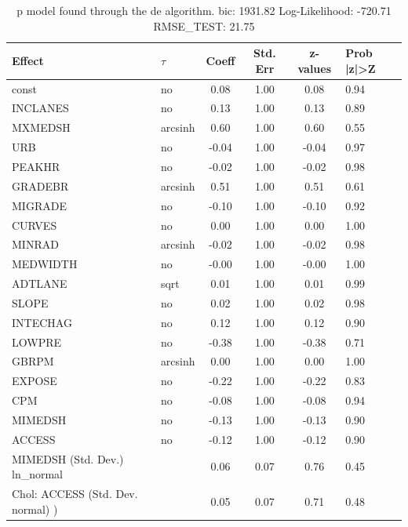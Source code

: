 \begin{table}
	\caption{p model found through the de algorithm. bic: 1931.82 Log-Likelihood: -720.71 RMSE_TEST: 21.75}
	\begin{center}
		\begin{tabular}{|l|l|c|c|c|l|}
			\hline
			Effect & $\tau$ & Coeff & Std. Err & z-values & Prob |z|>Z \\
			\hline
			const & no & 0.08 & 1.00 & 0.08 & 0.94 \\
			\hline
			INCLANES & no & 0.13 & 1.00 & 0.13 & 0.89 \\
			\hline
			MXMEDSH & arcsinh & 0.60 & 1.00 & 0.60 & 0.55 \\
			\hline
			URB & no & -0.04 & 1.00 & -0.04 & 0.97 \\
			\hline
			PEAKHR & no & -0.02 & 1.00 & -0.02 & 0.98 \\
			\hline
			GRADEBR & arcsinh & 0.51 & 1.00 & 0.51 & 0.61 \\
			\hline
			MIGRADE & no & -0.10 & 1.00 & -0.10 & 0.92 \\
			\hline
			CURVES & no & 0.00 & 1.00 & 0.00 & 1.00 \\
			\hline
			MINRAD & arcsinh & -0.02 & 1.00 & -0.02 & 0.98 \\
			\hline
			MEDWIDTH & no & -0.00 & 1.00 & -0.00 & 1.00 \\
			\hline
			ADTLANE & sqrt & 0.01 & 1.00 & 0.01 & 0.99 \\
			\hline
			SLOPE & no & 0.02 & 1.00 & 0.02 & 0.98 \\
			\hline
			INTECHAG & no & 0.12 & 1.00 & 0.12 & 0.90 \\
			\hline
			LOWPRE & no & -0.38 & 1.00 & -0.38 & 0.71 \\
			\hline
			GBRPM & arcsinh & 0.00 & 1.00 & 0.00 & 1.00 \\
			\hline
			EXPOSE & no & -0.22 & 1.00 & -0.22 & 0.83 \\
			\hline
			CPM & no & -0.08 & 1.00 & -0.08 & 0.94 \\
			\hline
			MIMEDSH & no & -0.13 & 1.00 & -0.13 & 0.90 \\
			\hline
			ACCESS & no & -0.12 & 1.00 & -0.12 & 0.90 \\
			\hline
			MIMEDSH (Std. Dev.) ln_normal &  & 0.06 & 0.07 & 0.76 & 0.45 \\
			\hline
			 Chol: ACCESS (Std. Dev. normal) ) &  & 0.05 & 0.07 & 0.71 & 0.48 \\
			\hline
		\end{tabular}
	\end{center}
\end{table}